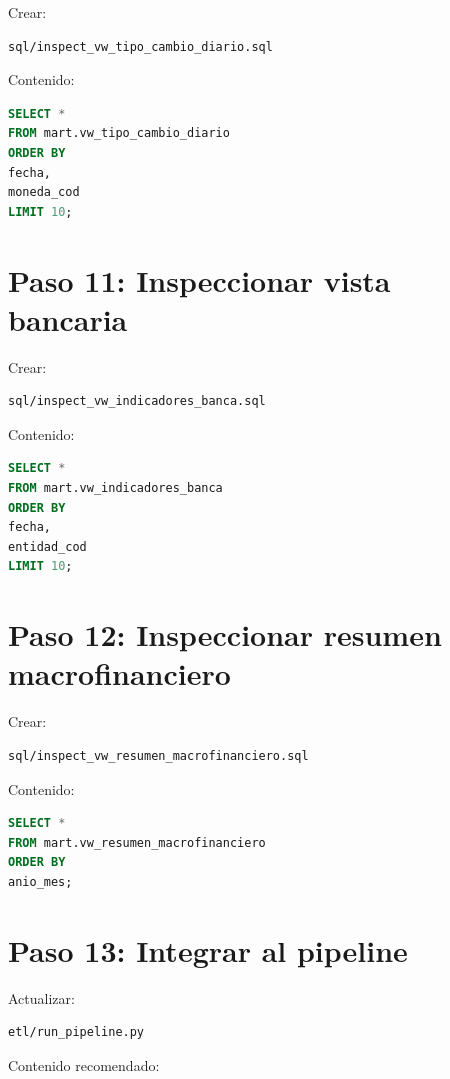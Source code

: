 Crear:

\begin{verbatim}
sql/inspect_vw_tipo_cambio_diario.sql
\end{verbatim}

Contenido:

\begin{lstlisting}[language=SQL]
SELECT *
FROM mart.vw_tipo_cambio_diario
ORDER BY
fecha,
moneda_cod
LIMIT 10;
\end{lstlisting}

\section{Paso 11: Inspeccionar vista bancaria}

Crear:

\begin{verbatim}
sql/inspect_vw_indicadores_banca.sql
\end{verbatim}

Contenido:

\begin{lstlisting}[language=SQL]
SELECT *
FROM mart.vw_indicadores_banca
ORDER BY
fecha,
entidad_cod
LIMIT 10;
\end{lstlisting}

\section{Paso 12: Inspeccionar resumen macrofinanciero}

Crear:

\begin{verbatim}
sql/inspect_vw_resumen_macrofinanciero.sql
\end{verbatim}

Contenido:

\begin{lstlisting}[language=SQL]
SELECT *
FROM mart.vw_resumen_macrofinanciero
ORDER BY
anio_mes;
\end{lstlisting}

\section{Paso 13: Integrar al pipeline}

Actualizar:

\begin{verbatim}
etl/run_pipeline.py
\end{verbatim}

Contenido recomendado:

